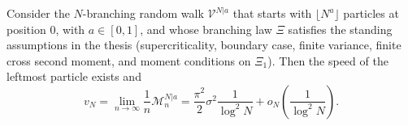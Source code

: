 \begin{theorem}
Consider the $N$-branching random walk $\mathcal V^{N|a}$ that starts with $\lfloor N^a\rfloor$ particles at position $0$, with $a\in[0,1]$, and whose branching law $\Xi$ satisfies the standing assumptions in the thesis (supercriticality, boundary case, finite variance, finite cross second moment, and moment conditions on $\Xi_1$).
Then the speed of the leftmost particle exists and
\[
    v_N
    =
    \lim_{n\to\infty}\frac{1}{n}\mathcal M^{N|a}_n
    =
    \frac{\pi^2}{2}\sigma^2\frac{1}{\log^2 N}
    +
    o_N\!\left(\frac{1}{\log^2 N}\right).
\]
\end{theorem}
